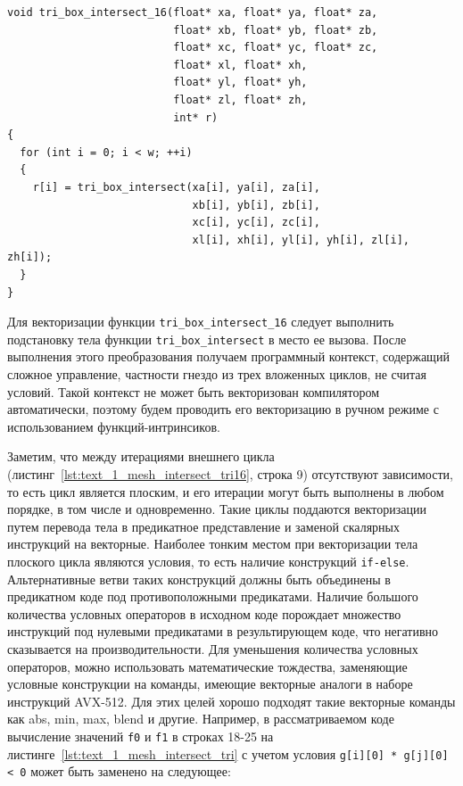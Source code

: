 \begin{singlespace}
\begin{lstlisting}[caption={Исходная реализация функции, объединяющей 16 вызовов функции \texttt{tri\_box\_intersect}.},label={lst:text_1_mesh_intersect_tri16}]
void tri_box_intersect_16(float* xa, float* ya, float* za,
                          float* xb, float* yb, float* zb,
                          float* xc, float* yc, float* zc,
                          float* xl, float* xh,
                          float* yl, float* yh,
                          float* zl, float* zh,
                          int* r)
{
  for (int i = 0; i < w; ++i)
  {
    r[i] = tri_box_intersect(xa[i], ya[i], za[i],
                             xb[i], yb[i], zb[i],
                             xc[i], yc[i], zc[i],
                             xl[i], xh[i], yl[i], yh[i], zl[i], zh[i]);
  }
}
\end{lstlisting}
\end{singlespace}

Для векторизации функции \texttt{tri\_box\_intersect\_16} следует выполнить подстановку тела функции \texttt{tri\_box\_intersect} в место ее вызова.
После выполнения этого преобразования получаем программный контекст, содержащий сложное управление, частности гнездо из трех вложенных циклов, не считая условий.
Такой контекст не может быть векторизован компилятором автоматически, поэтому будем проводить его векторизацию в ручном режиме с использованием функций-интринсиков\label{term:intrinsic4}.

Заметим, что между итерациями внешнего цикла (листинг~\ref{lst:text_1_mesh_intersect_tri16}, строка 9) отсутствуют зависимости, то есть цикл является плоским, и его итерации могут быть выполнены в любом порядке, в том числе и одновременно.
Такие циклы поддаются векторизации путем перевода тела в предикатное представление\label{term:predicate_view2} и заменой скалярных инструкций на векторные.
Наиболее тонким местом при векторизации тела плоского цикла являются условия, то есть наличие конструкций \texttt{if-else}.
Альтернативные ветви таких конструкций должны быть объединены в предикатном коде под противоположными предикатами.
Наличие большого количества условных операторов в исходном коде порождает множество инструкций под нулевыми предикатами в результирующем коде, что негативно сказывается на производительности.
Для уменьшения количества условных операторов, можно использовать математические тождества, заменяющие условные конструкции на команды, имеющие векторные аналоги в наборе инструкций AVX-512\label{abbr:avx6}.
Для этих целей хорошо подходят такие векторные команды как abs, min, max, blend и другие.
Например, в рассматриваемом коде вычисление значений \texttt{f0} и \texttt{f1} в строках 18-25 на листинге~\ref{lst:text_1_mesh_intersect_tri} с учетом условия \texttt{g[i][0] * g[j][0] < 0} может быть заменено на следующее:


